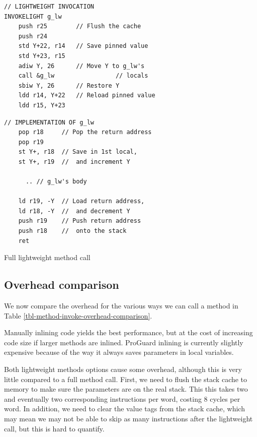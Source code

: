 \begin{listing}
\centering
\begin{minipage}[t]{0.48\textwidth}
\begin{verbatim}
// LIGHTWEIGHT INVOCATION
INVOKELIGHT g_lw
    push r25        // Flush the cache
    push r24
    std Y+22, r14   // Save pinned value
    std Y+23, r15
    adiw Y, 26      // Move Y to g_lw's
    call &g_lw                 // locals
    sbiw Y, 26      // Restore Y
    ldd r14, Y+22   // Reload pinned value
    ldd r15, Y+23
\end{verbatim}
\end{minipage}\hfill
\begin{minipage}[t]{0.48\textwidth}
\centering
\begin{verbatim}
// IMPLEMENTATION OF g_lw
    pop r18     // Pop the return address
    pop r19
    st Y+, r18  // Save in 1st local,
    st Y+, r19  //  and increment Y

      .. // g_lw's body

    ld r19, -Y  // Load return address,
    ld r18, -Y  //  and decrement Y
    push r19    // Push return address
    push r18    //  onto the stack
    ret
\end{verbatim}
\end{minipage}
\caption{Full lightweight method call}
\label{lst-full-lighweight-method-call}
\end{listing}


\subsection{Overhead comparison}
We now compare the overhead for the various ways we can call a method in Table \ref{tbl-method-invoke-overhead-comparison}.

Manually inlining code yields the best performance, but at the cost of increasing code size if larger methods are inlined. ProGuard inlining is currently slightly expensive because of the way it always saves parameters in local variables.

Both lightweight methods options cause some overhead, although this is very little compared to a full method call. First, we need to flush the stack cache to memory to make sure the parameters are on the real stack. This this takes two  and eventually two corresponding  instructions per word, costing 8 cycles per word. In addition, we need to clear the value tags from the stack cache, which may mean we may not be able to skip as many  instructions after the lightweight call, but this is hard to quantify.

